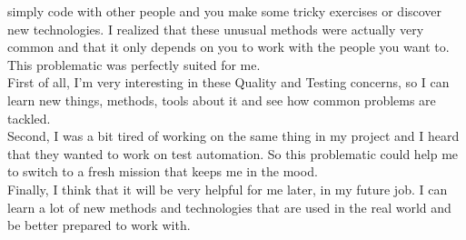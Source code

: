 simply code with other people and you make some tricky exercises or
discover new technologies.
I realized that these unusual methods were actually very common and that
it only depends on you to work with the people you want to. \\
\newline
This problematic was perfectly suited for me. \\
First of all, I'm very interesting in these Quality and Testing concerns,
so I can learn new things, methods, tools about it and see how common
problems are tackled. \\
Second, I was a bit tired of working on the same thing in my project and
I heard that they wanted to work on test automation.
So this problematic could help me to switch to a fresh mission that keeps
me in the mood. \\
Finally, I think that it will be very helpful for me later, in my future
job.
I can learn a lot of new methods and technologies that are used in the
real world and be better prepared to work with.